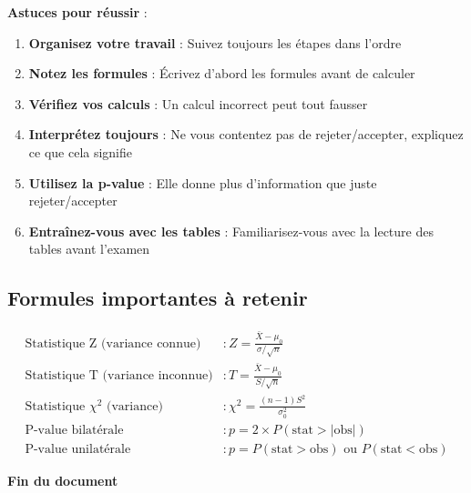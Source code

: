 \documentclass[11pt,a4paper]{article}
\newcommand{\chideux}{\chi^2}
\begin{document}
\begin{astucebox}
\textbf{Astuces pour réussir} :
\begin{enumerate}
    \item \textbf{Organisez votre travail} : Suivez toujours les étapes dans l'ordre
    \item \textbf{Notez les formules} : Écrivez d'abord les formules avant de calculer
    \item \textbf{Vérifiez vos calculs} : Un calcul incorrect peut tout fausser
    \item \textbf{Interprétez toujours} : Ne vous contentez pas de rejeter/accepter, expliquez ce que cela signifie
    \item \textbf{Utilisez la p-value} : Elle donne plus d'information que juste rejeter/accepter
    \item \textbf{Entraînez-vous avec les tables} : Familiarisez-vous avec la lecture des tables avant l'examen
\end{enumerate}
\end{astucebox}

\subsection{Formules importantes à retenir}

\begin{align*}
\text{Statistique Z (variance connue)} &: Z = \frac{\bar{X} - \mu_0}{\sigma/\sqrt{n}} \\
\text{Statistique T (variance inconnue)} &: T = \frac{\bar{X} - \mu_0}{S/\sqrt{n}} \\
\text{Statistique } \chideux \text{ (variance)} &: \chideux = \frac{(n-1)S^2}{\sigma_0^2} \\
\text{P-value bilatérale} &: p = 2 \times P(\text{stat} > |\text{obs}|) \\
\text{P-value unilatérale} &: p = P(\text{stat} > \text{obs}) \text{ ou } P(\text{stat} < \text{obs})
\end{align*}

\vspace{2cm}

\begin{center}
\textbf{Fin du document}
\end{center}
\end{document}
